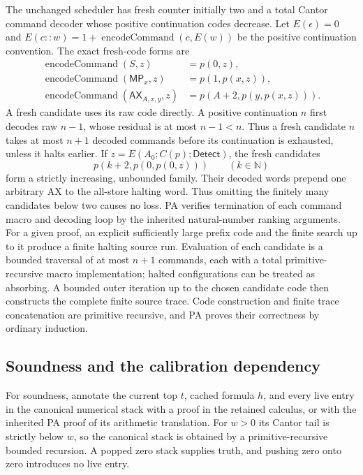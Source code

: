The unchanged scheduler has fresh counter initially two and a total
Cantor command decoder whose positive continuation codes decrease.
Let $E(\epsilon)=0$ and
$E(c::w)=1+\operatorname{encodeCommand}(c,E(w))$ be the positive
continuation convention. The exact fresh-code forms are
\[
\begin{aligned}
 \operatorname{encodeCommand}(S,z)&=p(0,z),\\
 \operatorname{encodeCommand}(\mathsf{MP}_x,z)&=p(1,p(x,z)),\\
 \operatorname{encodeCommand}(\mathsf{AX}_{A,x,y},z)
                     &=p(A+2,p(y,p(x,z))).
\end{aligned}
\]
A fresh candidate uses its raw code directly. A positive continuation $n$
first decodes raw $n-1$, whose residual is at most $n-1<n$. Thus a fresh
candidate $n$ takes at most $n+1$ decoded commands before its continuation
is exhausted, unless it halts earlier.
If $z=E(A_0;C(p);\mathsf{Detect})$, the fresh candidates
\[
                  p(k+2,p(0,p(0,z)))\qquad(k\in\mathbb N)
\]
form a strictly increasing, unbounded family. Their decoded words prepend
one arbitrary AX to the all-store halting word. Thus omitting the finitely
many candidates below two causes no loss. PA verifies termination of each
command macro and decoding loop by the inherited natural-number ranking
arguments. For a given proof, an explicit sufficiently large prefix code
and the finite search up to it produce a finite halting source run.
Evaluation of each candidate is a bounded traversal of at most $n+1$
commands, each with a total primitive-recursive macro implementation;
halted configurations can be treated as absorbing. A bounded outer
iteration up to the chosen candidate code then constructs the complete
finite source trace. Code construction and finite trace concatenation are
primitive recursive, and PA proves their correctness by ordinary induction.

\subsection{Soundness and the calibration dependency}

For soundness, annotate the current top $t$, cached formula $h$, and every
live entry in the canonical numerical stack with a proof in the retained
calculus, or with the inherited PA proof of its arithmetic translation.
For $w>0$ its Cantor tail is strictly below $w$, so the canonical stack is
obtained by a primitive-recursive bounded recursion. A popped zero stack
supplies truth, and pushing zero onto zero introduces no live entry.

